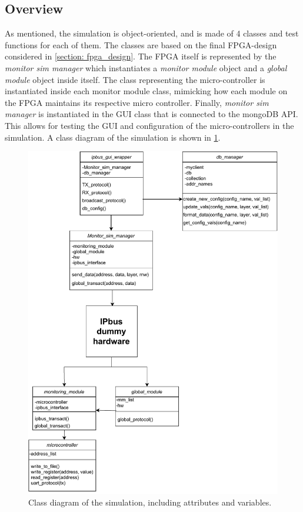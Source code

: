 \documentclass[main.tex]{subfiles}
\begin{document}
\subsection{Overview}
As mentioned, the simulation is object-oriented, and is made of 4 classes and test functions for each of them. The classes are based on the final FPGA-design considered in \ref{section: fpga_design}. The FPGA itself is represented by the \textit{monitor sim manager} which instantiates a \textit{monitor module} object and a \textit{global module} object inside itself. The class representing the micro-controller is instantiated inside each monitor module class, mimicking how each module on the FPGA maintains its respective micro controller. Finally, \textit{monitor sim manager} is instantiated in the GUI class that is connected to the mongoDB API. This allows for testing the GUI and configuration of the micro-controllers in the simulation.  A class diagram of the simulation is shown in \ref{fig: class_diagram}.

\begin{figure}[!ht]
    \centering
    \includegraphics[width=14cm]{images/class chart.pdf}
    \caption{Class diagram of the simulation, including attributes and variables.}
    \label{fig: class_diagram}
\end{figure}
\FloatBarrier
\end{document}
